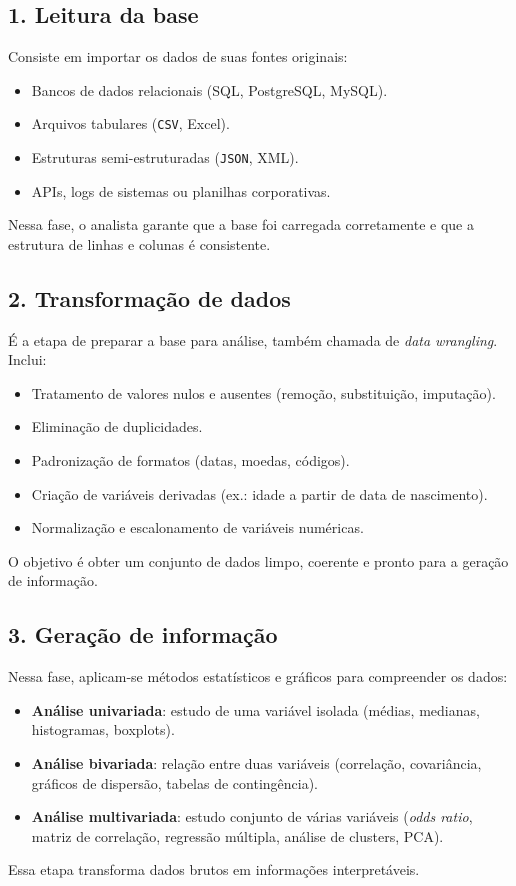 \subsection*{1. Leitura da base}
Consiste em importar os dados de suas fontes originais:
\begin{itemize}[leftmargin=*]
  \item Bancos de dados relacionais (SQL, PostgreSQL, MySQL).
  \item Arquivos tabulares (\texttt{CSV}, Excel).
  \item Estruturas semi-estruturadas (\texttt{JSON}, XML).
  \item APIs, logs de sistemas ou planilhas corporativas.
\end{itemize}
Nessa fase, o analista garante que a base foi carregada corretamente e que a estrutura de linhas e colunas é consistente.

\subsection*{2. Transformação de dados}
É a etapa de preparar a base para análise, também chamada de \textit{data wrangling}. Inclui:
\begin{itemize}[leftmargin=*]
  \item Tratamento de valores nulos e ausentes (remoção, substituição, imputação).
  \item Eliminação de duplicidades.
  \item Padronização de formatos (datas, moedas, códigos).
  \item Criação de variáveis derivadas (ex.: idade a partir de data de nascimento).
  \item Normalização e escalonamento de variáveis numéricas.
\end{itemize}
O objetivo é obter um conjunto de dados limpo, coerente e pronto para a geração de informação.

\subsection*{3. Geração de informação}
Nessa fase, aplicam-se métodos estatísticos e gráficos para compreender os dados:
\begin{itemize}[leftmargin=*]
  \item \textbf{Análise univariada}: estudo de uma variável isolada (médias, medianas, histogramas, boxplots).
  \item \textbf{Análise bivariada}: relação entre duas variáveis (correlação, covariância, gráficos de dispersão, tabelas de contingência).
  \item \textbf{Análise multivariada}: estudo conjunto de várias variáveis (\textit{odds ratio}, matriz de correlação, regressão múltipla, análise de clusters, PCA).
\end{itemize}
Essa etapa transforma dados brutos em informações interpretáveis.

